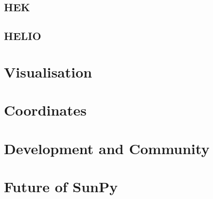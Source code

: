 \documentclass[12pt]{iopart}
\begin{document}
	\subsection{HEK}
	
	\subsection{HELIO}

\section{Visualisation}

\section{Coordinates}

\section{Development and Community}

\section{Future of SunPy}

{}
\end{document}
